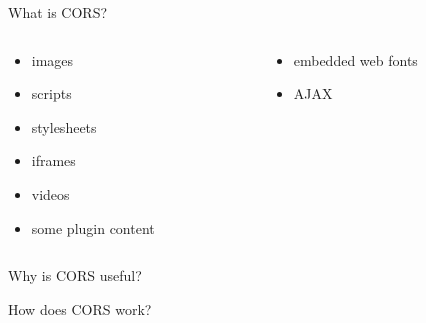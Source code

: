 \documentclass[11pt]{beamer}
\begin{document}
\begin{frame}{What is CORS?}
  \begin{columns}[t]
    \begin{column}
      \begin{itemize}
      \item images\\
      \item scripts\\
      \item stylesheets\\
      \item iframes\\
      \item videos\\
      \item some plugin content
      \end{itemize}
    \end{column}
    \begin{column}
      \begin{itemize}
      \item embedded web fonts\\
      \item AJAX
      \end{itemize}
    \end{column}
  \end{columns}
\end{frame}

\begin{frame}{Why is CORS useful?}

\end{frame}
\begin{frame}{How does CORS work?}

\end{frame}
\end{document}

